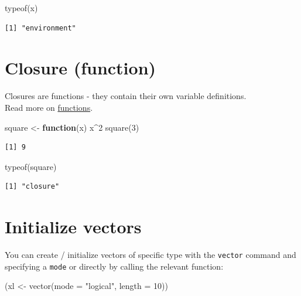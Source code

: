 \documentclass[
]{book}
\newenvironment{Shaded}{\begin{snugshade}}{\end{snugshade}}
\newcommand{\AttributeTok}[1]{\textcolor[rgb]{0.77,0.63,0.00}{#1}}
\newcommand{\ControlFlowTok}[1]{\textcolor[rgb]{0.13,0.29,0.53}{\textbf{#1}}}
\newcommand{\DecValTok}[1]{\textcolor[rgb]{0.00,0.00,0.81}{#1}}
\newcommand{\FunctionTok}[1]{\textcolor[rgb]{0.00,0.00,0.00}{#1}}
\newcommand{\NormalTok}[1]{#1}
\newcommand{\OtherTok}[1]{\textcolor[rgb]{0.56,0.35,0.01}{#1}}
\newcommand{\SpecialCharTok}[1]{\textcolor[rgb]{0.00,0.00,0.00}{#1}}
\newcommand{\StringTok}[1]{\textcolor[rgb]{0.31,0.60,0.02}{#1}}
\begin{document}
\begin{Shaded}
\begin{Highlighting}[]
\FunctionTok{typeof}\NormalTok{(x)}
\end{Highlighting}
\end{Shaded}

\begin{verbatim}
[1] "environment"
\end{verbatim}

\hypertarget{closure-function}{%
\section{Closure (function)}\label{closure-function}}

Closures are functions - they contain their own variable definitions.\\
Read more on \protect\hyperlink{functions}{functions}.

\begin{Shaded}
\begin{Highlighting}[]
\NormalTok{square }\OtherTok{\textless{}{-}} \ControlFlowTok{function}\NormalTok{(x) x}\SpecialCharTok{\^{}}\DecValTok{2}
\FunctionTok{square}\NormalTok{(}\DecValTok{3}\NormalTok{)}
\end{Highlighting}
\end{Shaded}

\begin{verbatim}
[1] 9
\end{verbatim}

\begin{Shaded}
\begin{Highlighting}[]
\FunctionTok{typeof}\NormalTok{(square)}
\end{Highlighting}
\end{Shaded}

\begin{verbatim}
[1] "closure"
\end{verbatim}

\hypertarget{initialize-vectors}{%
\section{Initialize vectors}\label{initialize-vectors}}

You can create / initialize vectors of specific type with the \texttt{vector} command and specifying a \texttt{mode} or directly by calling the relevant function:

\begin{Shaded}
\begin{Highlighting}[]
\NormalTok{(xl }\OtherTok{\textless{}{-}} \FunctionTok{vector}\NormalTok{(}\AttributeTok{mode =} \StringTok{"logical"}\NormalTok{, }\AttributeTok{length =} \DecValTok{10}\NormalTok{))}
\end{Highlighting}
\end{Shaded}
\end{document}
